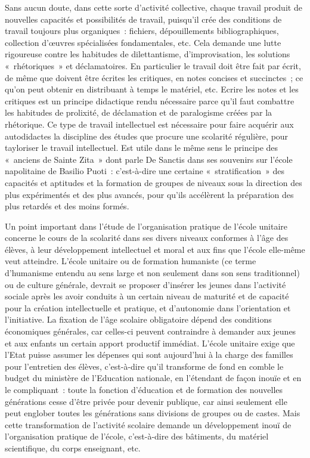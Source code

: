 \documentclass[french,twoside]{book} %
\begin{document}
Sans aucun doute, dans cette sorte d’activité collective, chaque travail produit de nouvelles capacités et possibilités de travail, puisqu’il crée des conditions de travail toujours plus organiques : fichiers, dépouillements bibliographiques, collection d’œuvres spécialisées fondamentales, etc. Cela demande une lutte rigoureuse contre les habitudes de dilettantisme, d’improvisation, les solutions « rhétoriques » et déclamatoires. En particulier le travail doit être fait par écrit, de même que doivent être écrites les critiques, en notes concises et succinctes ; ce qu’on peut obtenir en distribuant à temps le matériel, etc. Ecrire les notes et les critiques est un principe didactique rendu nécessaire parce qu’il faut combattre les habitudes de prolixité, de déclamation et de paralogisme créées par la rhétorique. Ce type de travail intellectuel est nécessaire pour faire acquérir aux autodidactes la discipline des études que procure une scolarité régulière, pour tayloriser le travail intellectuel. Est utile dans le même sens le principe des « anciens de Sainte Zita » dont parle De Sanctis dans ses souvenirs sur l’école napolitaine de Basilio Puoti : c’est-à-dire une certaine « stratification » des capacités et aptitudes et la formation de groupes de niveaux sous la direction des plus expérimentés et des plus avancés, pour qu’ils accélèrent la préparation des plus retardés et des moins formés.\par
Un point important dans l’étude de l’organisation pratique de l’école unitaire concerne le cours de la scolarité dans ses divers niveaux conformes à l’âge des élèves, à leur développement intellectuel et moral et aux fins que l’école elle-même veut atteindre. L'école unitaire ou de formation humaniste (ce terme d’humanisme entendu au sens large et non seulement dans son sens traditionnel) ou de culture générale, devrait se proposer d’insérer les jeunes dans l’activité sociale après les avoir conduits à un certain niveau de maturité et de capacité pour la création intellectuelle et pratique, et d’autonomie dans l’orientation et l’initiative. La fixation de l’âge scolaire obligatoire dépend des conditions économiques générales, car celles-ci peuvent contraindre à demander aux jeunes et aux enfants un certain apport productif immédiat. L'école unitaire exige que l’Etat puisse assumer les dépenses qui sont aujourd’hui à la charge des familles pour l’entretien des élèves, c’est-à-dire qu’il transforme de fond en comble le budget du ministère de l’Education nationale, en l’étendant de façon inouïe et en le compliquant : toute la fonction d’éducation et de formation des nouvelles générations cesse d’être privée pour devenir publique, car ainsi seulement elle peut englober toutes les générations sans divisions de groupes ou de castes. Mais cette transformation de l’activité scolaire demande un développement inouï de l’organisation pratique de l’école, c’est-à-dire des bâtiments, du matériel scientifique, du corps enseignant, etc.\par
\end{document}
